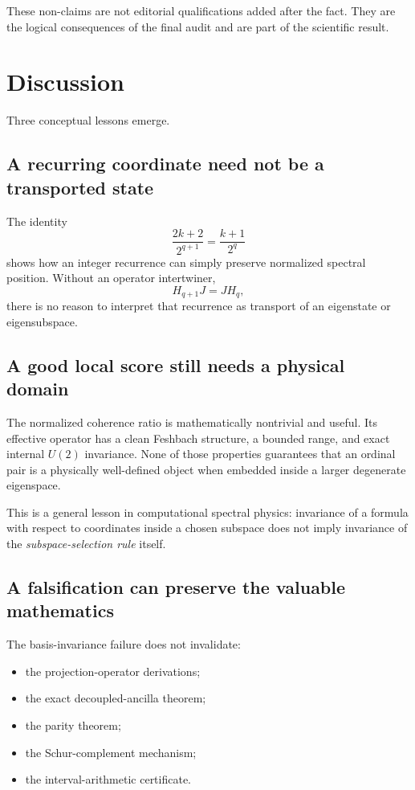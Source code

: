 \documentclass[11pt,a4paper]{article}
\begin{document}
These non-claims are not editorial qualifications added after the fact.  They
are the logical consequences of the final audit and are part of the scientific
result.

\section{Discussion}

Three conceptual lessons emerge.

\subsection{A recurring coordinate need not be a transported state}

The identity
\[
\frac{2k+2}{2^{q+1}}=\frac{k+1}{2^q}
\]
shows how an integer recurrence can simply preserve normalized spectral
position.  Without an operator intertwiner,
\[
H_{q+1}J=JH_q,
\]
there is no reason to interpret that recurrence as transport of an eigenstate
or eigensubspace.

\subsection{A good local score still needs a physical domain}

The normalized coherence ratio is mathematically nontrivial and useful.  Its
effective operator has a clean Feshbach structure, a bounded range, and exact
internal \(U(2)\) invariance.  None of those properties guarantees that an
ordinal pair is a physically well-defined object when embedded inside a
larger degenerate eigenspace.

This is a general lesson in computational spectral physics: invariance of a
formula with respect to coordinates inside a chosen subspace does not imply
invariance of the \emph{subspace-selection rule} itself.

\subsection{A falsification can preserve the valuable mathematics}

The basis-invariance failure does not invalidate:

\begin{itemize}
\item the projection-operator derivations;
\item the exact decoupled-ancilla theorem;
\item the parity theorem;
\item the Schur-complement mechanism;
\item the interval-arithmetic certificate.
\end{itemize}
\end{document}
